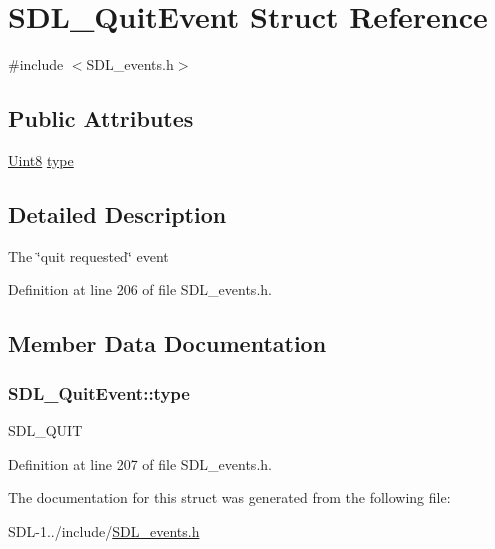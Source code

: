 \hypertarget{struct_s_d_l___quit_event}{}\section{S\+D\+L\+\_\+\+Quit\+Event Struct Reference}
\label{struct_s_d_l___quit_event}


{\ttfamily \#include $<$S\+D\+L\+\_\+events.\+h$>$}

\subsection*{Public Attributes}
\begin{DoxyCompactItemize}
\item 
\hyperlink{_s_d_l__stdinc_8h_a2944638813a090aa23e62f4da842c3e2}{Uint8} \hyperlink{struct_s_d_l___quit_event_a870ea801afd2d8ef77fa592648873d12}{type}
\end{DoxyCompactItemize}


\subsection{Detailed Description}
The \char`\"{}quit requested\char`\"{} event 

Definition at line 206 of file S\+D\+L\+\_\+events.\+h.



\subsection{Member Data Documentation}
\hypertarget{struct_s_d_l___quit_event_a870ea801afd2d8ef77fa592648873d12}{}
\subsubsection[{type}]{ S\+D\+L\+\_\+\+Quit\+Event\+::type}\label{struct_s_d_l___quit_event_a870ea801afd2d8ef77fa592648873d12}
S\+D\+L\+\_\+\+Q\+U\+I\+T 

Definition at line 207 of file S\+D\+L\+\_\+events.\+h.



The documentation for this struct was generated from the following file\+:\begin{DoxyCompactItemize}
\item 
S\+D\+L-\/1../include/\hyperlink{_s_d_l__events_8h}{S\+D\+L\+\_\+events.\+h}\end{DoxyCompactItemize}
